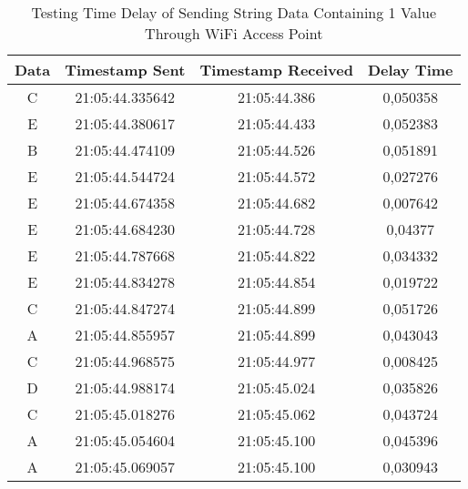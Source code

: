 \begin{table}[!h]
  \caption{Testing Time Delay of Sending String Data Containing 1 Value Through WiFi Access Point}
  \label{tbl:delayWiFi1}
  \begin{tabular}{|ccc|c|}
  \hline
  \multicolumn{1}{|c|}{Data} & \multicolumn{1}{c|}{Timestamp Sent}  & Timestamp Received & Delay Time    \\ \hline
  \multicolumn{1}{|c|}{C}    & \multicolumn{1}{c|}{21:05:44.335642} & 21:05:44.386       & 0,050358      \\ \hline
  \multicolumn{1}{|c|}{E}    & \multicolumn{1}{c|}{21:05:44.380617} & 21:05:44.433       & 0,052383      \\ \hline
  \multicolumn{1}{|c|}{B}    & \multicolumn{1}{c|}{21:05:44.474109} & 21:05:44.526       & 0,051891      \\ \hline
  \multicolumn{1}{|c|}{E}    & \multicolumn{1}{c|}{21:05:44.544724} & 21:05:44.572       & 0,027276      \\ \hline
  \multicolumn{1}{|c|}{E}    & \multicolumn{1}{c|}{21:05:44.674358} & 21:05:44.682       & 0,007642      \\ \hline
  \multicolumn{1}{|c|}{E}    & \multicolumn{1}{c|}{21:05:44.684230} & 21:05:44.728       & 0,04377       \\ \hline
  \multicolumn{1}{|c|}{E}    & \multicolumn{1}{c|}{21:05:44.787668} & 21:05:44.822       & 0,034332      \\ \hline
  \multicolumn{1}{|c|}{E}    & \multicolumn{1}{c|}{21:05:44.834278} & 21:05:44.854       & 0,019722      \\ \hline
  \multicolumn{1}{|c|}{C}    & \multicolumn{1}{c|}{21:05:44.847274} & 21:05:44.899       & 0,051726      \\ \hline
  \multicolumn{1}{|c|}{A}    & \multicolumn{1}{c|}{21:05:44.855957} & 21:05:44.899       & 0,043043      \\ \hline
  \multicolumn{1}{|c|}{C}    & \multicolumn{1}{c|}{21:05:44.968575} & 21:05:44.977       & 0,008425      \\ \hline
  \multicolumn{1}{|c|}{D}    & \multicolumn{1}{c|}{21:05:44.988174} & 21:05:45.024       & 0,035826      \\ \hline
  \multicolumn{1}{|c|}{C}    & \multicolumn{1}{c|}{21:05:45.018276} & 21:05:45.062       & 0,043724      \\ \hline
  \multicolumn{1}{|c|}{A}    & \multicolumn{1}{c|}{21:05:45.054604} & 21:05:45.100       & 0,045396      \\ \hline
  \multicolumn{1}{|c|}{A}    & \multicolumn{1}{c|}{21:05:45.069057} & 21:05:45.100       & 0,030943      \\ \hline

\end{tabular}
\end{table}
